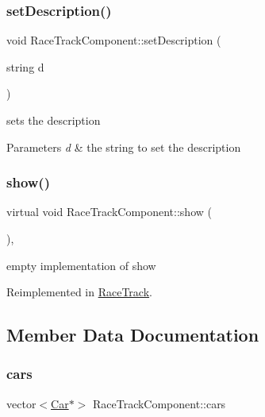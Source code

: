 \subsubsection{\texorpdfstring{set\+Description()}{setDescription()}}
{\footnotesize\ttfamily void Race\+Track\+Component\+::set\+Description (\begin{DoxyParamCaption}\item[{string}]{d }\end{DoxyParamCaption})\hspace{0.3cm}{\ttfamily [inline]}}

sets the description 
\begin{DoxyParams}{Parameters}
{\em d} & the string to set the description \\
\hline
\end{DoxyParams}
\mbox{\label{class_race_track_component_a109347e296fe7df389f157c01344a79a}} 
\subsubsection{\texorpdfstring{show()}{show()}}
{\footnotesize\ttfamily virtual void Race\+Track\+Component\+::show (\begin{DoxyParamCaption}{ }\end{DoxyParamCaption})\hspace{0.3cm}{\ttfamily [inline]}, {\ttfamily [virtual]}}

empty implementation of show 

Reimplemented in \mbox{\hyperlink{class_race_track_ad4d3cc9b17b4cf1173033dc2d0f7ffb5}{Race\+Track}}.



\subsection{Member Data Documentation}
\mbox{\label{class_race_track_component_a7ac8e22cd540bed371efab3e47ebe49b}} 
\subsubsection{\texorpdfstring{cars}{cars}}
{\footnotesize\ttfamily vector$<$\mbox{\hyperlink{class_car}{Car}}$\ast$$>$ Race\+Track\+Component\+::cars}

